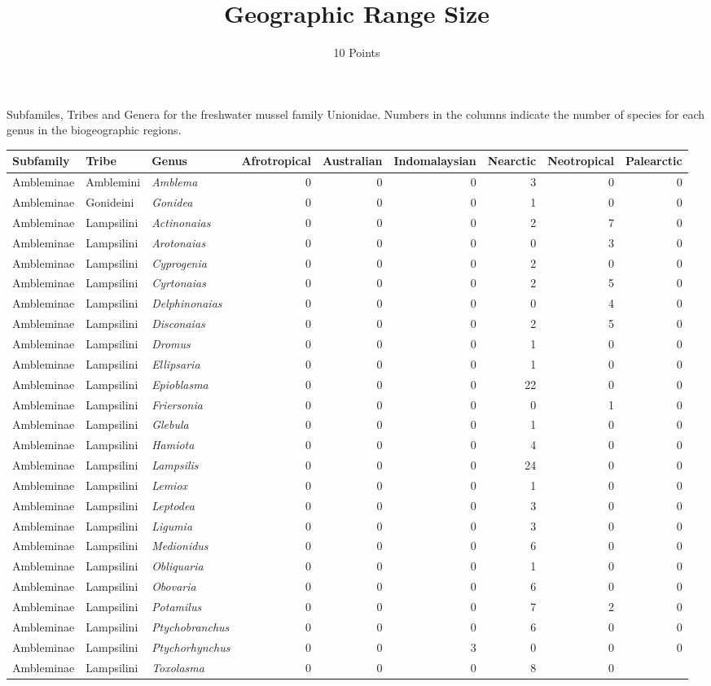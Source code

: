 \documentclass[11pt]{article}
\title{Geographic Range Size}
\author{10 Points}
\date{}                                           %
\begin{document}

Subfamiles, Tribes and Genera for the freshwater mussel family Unionidae. Numbers in the columns indicate the number of species for each genus in the biogeographic regions.

\begin{longtable}[l]{@{}lllrrrrrr@{}}
\toprule
Subfamily & Tribe & Genus &
Afrotropical & Australian & Indomalaysian &
Nearctic & Neotropical &
Palearctic\tabularnewline
\midrule
\endhead
Ambleminae & Amblemini & \textit{Amblema} & 0 & 0 & 0 & 3 & 0 &
0\tabularnewline
Ambleminae & Gonideini & \textit{Gonidea} & 0 & 0 & 0 & 1 & 0 &
0\tabularnewline
Ambleminae & Lampsilini & \textit{Actinonaias} & 0 & 0 & 0 & 2 & 7 &
0\tabularnewline
Ambleminae & Lampsilini & \textit{Arotonaias} & 0 & 0 & 0 & 0 & 3 &
0\tabularnewline
Ambleminae & Lampsilini & \textit{Cyprogenia} & 0 & 0 & 0 & 2 & 0 &
0\tabularnewline
Ambleminae & Lampsilini & \textit{Cyrtonaias} & 0 & 0 & 0 & 2 & 5 &
0\tabularnewline
Ambleminae & Lampsilini & \textit{Delphinonaias} & 0 & 0 & 0 & 0 & 4 &
0\tabularnewline
Ambleminae & Lampsilini & \textit{Disconaias} & 0 & 0 & 0 & 2 & 5 &
0\tabularnewline
Ambleminae & Lampsilini & \textit{Dromus} & 0 & 0 & 0 & 1 & 0 &
0\tabularnewline
Ambleminae & Lampsilini & \textit{Ellipsaria} & 0 & 0 & 0 & 1 & 0 &
0\tabularnewline
Ambleminae & Lampsilini & \textit{Epioblasma} & 0 & 0 & 0 & 22 & 0 &
0\tabularnewline
Ambleminae & Lampsilini & \textit{Friersonia} & 0 & 0 & 0 & 0 & 1 &
0\tabularnewline
Ambleminae & Lampsilini & \textit{Glebula} & 0 & 0 & 0 & 1 & 0 &
0\tabularnewline
Ambleminae & Lampsilini & \textit{Hamiota} & 0 & 0 & 0 & 4 & 0 &
0\tabularnewline
Ambleminae & Lampsilini & \textit{Lampsilis} & 0 & 0 & 0 & 24 & 0 &
0\tabularnewline
Ambleminae & Lampsilini & \textit{Lemiox} & 0 & 0 & 0 & 1 & 0 &
0\tabularnewline
Ambleminae & Lampsilini & \textit{Leptodea} & 0 & 0 & 0 & 3 & 0 &
0\tabularnewline
Ambleminae & Lampsilini & \textit{Ligumia} & 0 & 0 & 0 & 3 & 0 &
0\tabularnewline
Ambleminae & Lampsilini & \textit{Medionidus} & 0 & 0 & 0 & 6 & 0 &
0\tabularnewline
Ambleminae & Lampsilini & \textit{Obliquaria} & 0 & 0 & 0 & 1 & 0 &
0\tabularnewline
Ambleminae & Lampsilini & \textit{Obovaria} & 0 & 0 & 0 & 6 & 0 &
0\tabularnewline
Ambleminae & Lampsilini & \textit{Potamilus} & 0 & 0 & 0 & 7 & 2 &
0\tabularnewline
Ambleminae & Lampsilini & \textit{Ptychobranchus} & 0 & 0 & 0 & 6 & 0 &
0\tabularnewline
Ambleminae & Lampsilini & \textit{Ptychorhynchus} & 0 & 0 & 3 & 0 & 0 &
0\tabularnewline
Ambleminae & Lampsilini & \textit{Toxolasma} & 0 & 0 & 0 & 8 & 0 &

\end{longtable}
\end{document}
